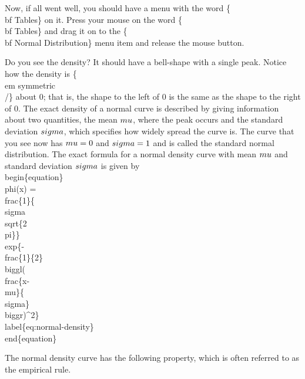 Now, if all went well, you should have a menu with the word \{\\bf
  Tables\} on it. Press your mouse on the word \{\\bf Tables\} and drag it
on to the \{\\bf Normal Distribution\} menu item and release the mouse
button.

Do you see the density? It should have a bell-shape with a single
peak. Notice how the density is \{\\em symmetric\\/\} about $0$; that is,
the shape to the left of $0$ is the same as the shape to the right of
$0$. The exact density of a normal curve is described by giving
information about two quantities, the mean $\\mu$, where the peak
occurs and the standard deviation $\\sigma$, which specifies how widely
spread the curve is. The curve that you see now has $\\mu=0$ and
$\\sigma=1$ and is called the standard normal distribution. The exact
formula for a normal density curve with mean $\\mu$ and standard
deviation $\\sigma$ is given by 
\\begin\{equation\}
\\phi(x) = \\frac\{1\}\{\\sigma\\sqrt\{2\\pi\}\}
\\exp\{-\\frac\{1\}\{2\}\\biggl(\\frac\{x-\\mu\}\{\\sigma\}\\biggr)^2\} 
\\label\{eq:normal-density\}
\\end\{equation\}

The normal density curve has the following property, which is often
referred to as the empirical rule. 

